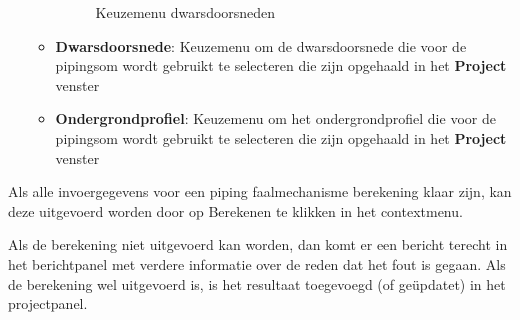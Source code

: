 \begin{enumerate}
\begin{itemize}
\begin{figure} [H]
	\caption{Keuzemenu dwarsdoorsneden}
	\label{fig:fig5.6}
\end{figure}
	\item \textbf{Dwarsdoorsnede}: Keuzemenu om de dwarsdoorsnede die voor de pipingsom wordt gebruikt te selecteren die zijn opgehaald in het \textbf{Project} venster
	\item \textbf{Ondergrondprofiel}: Keuzemenu om het ondergrondprofiel die voor de pipingsom wordt gebruikt te selecteren die zijn opgehaald in het \textbf{Project} venster
	\end{itemize}

\end{enumerate}








Als alle invoergegevens voor een piping faalmechanisme berekening klaar zijn, kan deze uitgevoerd worden door op Berekenen te klikken in het contextmenu.

Als de berekening niet uitgevoerd kan worden, dan komt er een bericht terecht in het berichtpanel met verdere informatie over de reden dat het fout is gegaan. Als de berekening wel uitgevoerd is, is het resultaat toegevoegd (of ge\"{u}pdatet) in het projectpanel.





